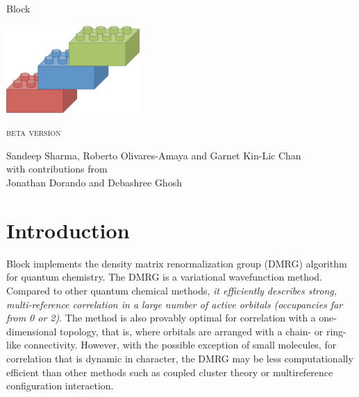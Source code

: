 \documentclass[letterpaper,12pt,aps, pra]{revtex4-1}
\begin{document}
\vfill
{\LARGE
  \begin{center}
{Block}
\end{center}
}
\vspace{0.5in}
\begin{center}{\includegraphics[width=2in]{block_logo}}\\
\end{center}
\vspace{0.5in}
\begin{center}
{\Large \textsc{beta version}}
\end{center}
\vspace{1in}

{\large
\begin{center}
Sandeep Sharma, Roberto Olivares-Amaya and Garnet Kin-Lic Chan\\
\vspace{0.2in}
with contributions from\\
\vspace{0.2in}
Jonathan Dorando and Debashree Ghosh
\end{center}
}
\vspace{1in}

\thispagestyle{empty}
\newpage

\tableofcontents
\newpage
{}

\section{Introduction}

Block implements the density matrix renormalization group (DMRG) algorithm for quantum chemistry. 
The DMRG is a variational wavefunction method. Compared to other quantum chemical methods, 
{\it it  efficiently describes strong, multi-reference correlation in
 a large number of active orbitals (occupancies far from 0 or 2)}.
The method is also provably optimal for correlation with a one-dimensional topology, that is,
where orbitals are arranged with a chain- or ring-like connectivity.
However, with the possible exception of small molecules, for correlation that is dynamic in character, the DMRG may be less computationally
efficient than other methods such as coupled cluster theory or multireference configuration interaction.
\end{document}
